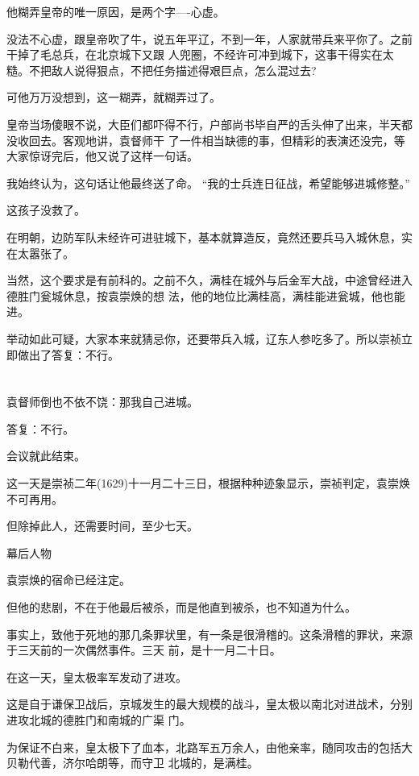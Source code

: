 \documentclass[11pt,a4paper,onecolumn]{article}
\begin{document}
他糊弄皇帝的唯一原因，是两个字----心虚。

没法不心虚，跟皇帝吹了牛，说五年平辽，不到一年，人家就带兵来平你了。之前干掉了毛总兵，在北京城下又跟
人兜圈，不经许可冲到城下，这事干得实在太糙。不把敌人说得狠点，不把任务描述得艰巨点，怎么混过去?

可他万万没想到，这一糊弄，就糊弄过了。

皇帝当场傻眼不说，大臣们都吓得不行，户部尚书毕自严的舌头伸了出来，半天都没收回去。客观地讲，袁督师干
了一件相当缺德的事，但精彩的表演还没完，等大家惊讶完后，他又说了这样一句话。

我始终认为，这句话让他最终送了命。 ``我的士兵连日征战，希望能够进城修整。''

这孩子没救了。

在明朝，边防军队未经许可进驻城下，基本就算造反，竟然还要兵马入城休息，实在太嚣张了。

当然，这个要求是有前科的。之前不久，满桂在城外与后金军大战，中途曾经进入德胜门瓮城休息，按袁崇焕的想
法，他的地位比满桂高，满桂能进瓮城，他也能进。

举动如此可疑，大家本来就猜忌你，还要带兵入城，辽东人参吃多了。所以崇祯立即做出了答复：不行。

\section[\thesection]{}

袁督师倒也不依不饶：那我自己进城。

答复：不行。

会议就此结束。

这一天是崇祯二年(1629)十一月二十三日，根据种种迹象显示，崇祯判定，袁崇焕不可再用。

但除掉此人，还需要时间，至少七天。

幕后人物

袁崇焕的宿命已经注定。

但他的悲剧，不在于他最后被杀，而是他直到被杀，也不知道为什么。

事实上，致他于死地的那几条罪状里，有一条是很滑稽的。这条滑稽的罪状，来源于三天前的一次偶然事件。三天
前，是十一月二十日。

在这一天，皇太极率军发动了进攻。

这是自于谦保卫战后，京城发生的最大规模的战斗，皇太极以南北对进战术，分别进攻北城的德胜门和南城的广渠
门。

为保证不白来，皇太极下了血本，北路军五万余人，由他亲率，随同攻击的包括大贝勒代善，济尔哈朗等，而守卫
北城的，是满桂。
\end{document}
